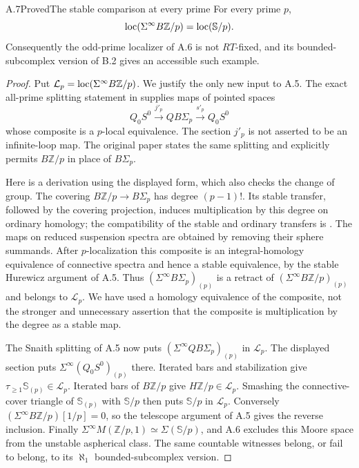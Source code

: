 \begin{claim}{A.7}{Proved}{The stable comparison at every prime}
For every prime $p$,
\[
 \operatorname{loc}(\Sigma^\infty B\mathbb Z/p)=\operatorname{loc}(\mathbb S/p).
\]
Consequently the odd-prime localizer of A.6 is not $RT$-fixed, and its bounded-subcomplex version of B.2 gives an accessible such example.
\end{claim}
\begin{proof}
Put $\mathcal L_p=\operatorname{loc}(\Sigma^\infty B\mathbb Z/p)$. We justify the only new input to A.5. The exact all-prime splitting statement in \citet[Theorem F]{CarusoCohenMayTaylor1984} supplies maps of pointed spaces
\[
 Q_0S^0\xrightarrow{j'_p}QB\Sigma_p
        \xrightarrow{s'_p}Q_0S^0
\]
whose composite is a $p$-local equivalence. The section $j'_p$ is not asserted to be an infinite-loop map. The original paper \citep[unnumbered main theorem, p.~103]{KahnPriddy1978} states the same splitting and explicitly permits $B\mathbb Z/p$ in place of $B\Sigma_p$.

Here is a derivation using the displayed form, which also checks the change of group. The covering $B\mathbb Z/p\to B\Sigma_p$ has degree $(p-1)!$. Its stable transfer, followed by the covering projection, induces multiplication by this degree on ordinary homology; the compatibility of the stable and ordinary transfers is \citet[Proposition 2.1 and Remark 2.3]{KahnPriddy1972}. The maps on reduced suspension spectra are obtained by removing their sphere summands. After $p$-localization this composite is an integral-homology equivalence of connective spectra and hence a stable equivalence, by the stable Hurewicz argument of A.5. Thus $(\Sigma^\infty B\Sigma_p)_{(p)}$ is a retract of $(\Sigma^\infty B\mathbb Z/p)_{(p)}$ and belongs to $\mathcal L_p$. We have used a homology equivalence of the composite, not the stronger and unnecessary assertion that the composite is multiplication by the degree as a stable map.

The Snaith splitting of A.5 now puts $(\Sigma^\infty QB\Sigma_p)_{(p)}$ in $\mathcal L_p$. The displayed section puts $\Sigma^\infty(Q_0S^0)_{(p)}$ there. Iterated bars and stabilization give $\tau_{\geq1}\mathbb S_{(p)}\in\mathcal L_p$. Iterated bars of $B\mathbb Z/p$ give $H\mathbb Z/p\in\mathcal L_p$. Smashing the connective-cover triangle of $\mathbb S_{(p)}$ with $\mathbb S/p$ then puts $\mathbb S/p$ in $\mathcal L_p$. Conversely $(\Sigma^\infty B\mathbb Z/p)[1/p]=0$, so the telescope argument of A.5 gives the reverse inclusion. Finally $\Sigma^\infty M(\mathbb Z/p,1)\simeq\Sigma(\mathbb S/p)$, and A.6 excludes this Moore space from the unstable aspherical class. The same countable witnesses belong, or fail to belong, to its $\aleph_1$ bounded-subcomplex version.
\end{proof}
